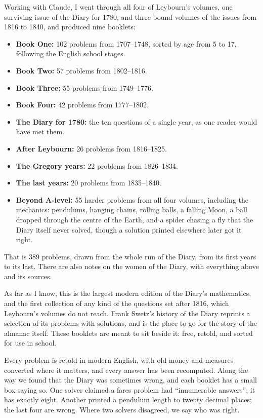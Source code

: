 \documentclass[11pt,a4paper]{article}
\providecommand{\tightlist}{\setlength{\itemsep}{0pt}\setlength{\parskip}{0pt}}
\begin{document}
Working with Claude, I went through all four of Leybourn's volumes, one
surviving issue of the Diary for 1780, and three bound volumes of the
issues from 1816 to 1840, and produced nine booklets:

\begin{itemize}
\tightlist
\item
  \textbf{Book One:} 102 problems from 1707--1748, sorted by age from 5
  to 17, following the English school stages.
\item
  \textbf{Book Two:} 57 problems from 1802--1816.
\item
  \textbf{Book Three:} 55 problems from 1749--1776.
\item
  \textbf{Book Four:} 42 problems from 1777--1802.
\item
  \textbf{The Diary for 1780:} the ten questions of a single year, as
  one reader would have met them.
\item
  \textbf{After Leybourn:} 26 problems from 1816--1825.
\item
  \textbf{The Gregory years:} 22 problems from 1826--1834.
\item
  \textbf{The last years:} 20 problems from 1835--1840.
\item
  \textbf{Beyond A-level:} 55 harder problems from all four volumes,
  including the mechanics: pendulums, hanging chains, rolling balls, a
  falling Moon, a ball dropped through the centre of the Earth, and a
  spider chasing a fly that the Diary itself never solved, though a
  solution printed elsewhere later got it right.
\end{itemize}

That is 389 problems, drawn from the whole run of the Diary, from its
first years to its last. There are also notes on the women of the Diary,
with everything above and its sources.

As far as I know, this is the largest modern edition of the Diary's
mathematics, and the first collection of any kind of the questions set
after 1816, which Leybourn's volumes do not reach. Frank Swetz's history
of the Diary reprints a selection of its problems with solutions, and is
the place to go for the story of the almanac itself. These booklets are
meant to sit beside it: free, retold, and sorted for use in school.

Every problem is retold in modern English, with old money and measures
converted where it matters, and every answer has been recomputed. Along
the way we found that the Diary was sometimes wrong, and each booklet
has a small box saying so. One solver claimed a fares problem had
``innumerable answers''; it has exactly eight. Another printed a
pendulum length to twenty decimal places; the last four are wrong. Where
two solvers disagreed, we say who was right.
\end{document}

